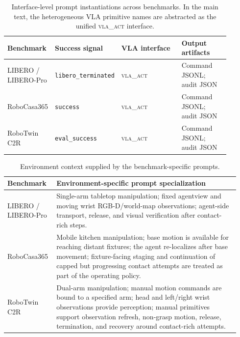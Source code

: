 \documentclass{article}
\begin{document}
 \begin{table}[h]
  \centering
  \caption{Interface-level prompt instantiations across benchmarks. In the main text,
  the heterogeneous VLA primitive names are abstracted as the unified
  \textsc{vla\_act} interface.}
  \label{tab:app_prompt_instantiations}
  \footnotesize
  \setlength{\tabcolsep}{3pt}
  \begin{tabular}{@{}p{0.18\linewidth}p{0.22\linewidth}p{0.28\linewidth}p{0.22\linewidth}@{}}
  \toprule
  Benchmark & Success signal & VLA interface & Output artifacts \\
  \midrule
  LIBERO / LIBERO-Pro &
  \texttt{libero\_terminated} &
  \textsc{vla\_act} &
  Command JSONL; audit JSON \\
  \midrule
  RoboCasa365 &
  \texttt{success} &
  \textsc{vla\_act} &
  Command JSONL; audit JSON \\
  \midrule
  RoboTwin C2R &
  \texttt{eval\_success} &
  \textsc{vla\_act} &
  Command JSONL; audit JSON \\
  \bottomrule
  \end{tabular}
  \end{table}

  \begin{table}[h]
  \centering
  \caption{Environment context supplied by the benchmark-specific prompts.}
  \label{tab:app_prompt_env_content}
  \footnotesize
  \setlength{\tabcolsep}{3pt}
  \begin{tabular}{@{}p{0.18\linewidth}p{0.76\linewidth}@{}}
  \toprule
  Benchmark & Environment-specific prompt specialization \\
  \midrule
  LIBERO / LIBERO-Pro &
  Single-arm tabletop manipulation; fixed agentview and moving wrist RGB-D/world-map
  observations; agent-side transport,
  release, and visual verification after contact-rich steps. \\
  \midrule
  RoboCasa365 &
  Mobile kitchen manipulation; base motion is available for reaching distant fixtures;
  the agent re-localizes after base movement; fixture-facing staging and continuation of
  capped but progressing contact attempts are treated as part of the operating policy. \\
  \midrule
  RoboTwin C2R &
  Dual-arm manipulation; manual motion commands are bound to a specified arm; head and
  left/right wrist observations provide perception; manual primitives support
  observation refresh, non-grasp motion, release, termination, and recovery around
  contact-rich attempts. \\
  \bottomrule
  \end{tabular}
  \end{table}
\end{document}
